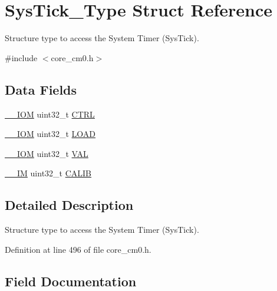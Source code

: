\hypertarget{struct_sys_tick___type}{}\section{Sys\+Tick\+\_\+\+Type Struct Reference}
\label{struct_sys_tick___type}


Structure type to access the System Timer (Sys\+Tick).  




{\ttfamily \#include $<$core\+\_\+cm0.\+h$>$}

\subsection*{Data Fields}
\begin{DoxyCompactItemize}
\item 
\hyperlink{core__sc300_8h_ab6caba5853a60a17e8e04499b52bf691}{\+\_\+\+\_\+\+I\+OM} uint32\+\_\+t \hyperlink{struct_sys_tick___type_ac81efc171e9852a36caeb47122bfec5b}{C\+T\+RL}
\item 
\hyperlink{core__sc300_8h_ab6caba5853a60a17e8e04499b52bf691}{\+\_\+\+\_\+\+I\+OM} uint32\+\_\+t \hyperlink{struct_sys_tick___type_a0c1333686137b7e25a46bd548a5b5bc3}{L\+O\+AD}
\item 
\hyperlink{core__sc300_8h_ab6caba5853a60a17e8e04499b52bf691}{\+\_\+\+\_\+\+I\+OM} uint32\+\_\+t \hyperlink{struct_sys_tick___type_ae7a655a853654127f3dfb7fa32c3f457}{V\+AL}
\item 
\hyperlink{core__sc300_8h_a4cc1649793116d7c2d8afce7a4ffce43}{\+\_\+\+\_\+\+IM} uint32\+\_\+t \hyperlink{struct_sys_tick___type_aedf0dff29a9cacdaa2fb7eec6b116a13}{C\+A\+L\+IB}
\end{DoxyCompactItemize}


\subsection{Detailed Description}
Structure type to access the System Timer (Sys\+Tick). 

Definition at line 496 of file core\+\_\+cm0.\+h.



\subsection{Field Documentation}
